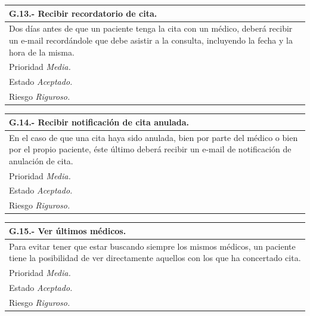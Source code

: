 \documentclass[a4paper,oneside,11pt]{book}
\begin{document}
\begin{center}
\begin{tabulary}{15cm}{|L|}
	\hline
		\bf{G.13.- Recibir recordatorio de cita.} \\
	\hline
		Dos días antes de que un paciente tenga la cita con un médico, deberá recibir un e-mail recordándole que debe asistir a la consulta, incluyendo la fecha y la hora de la misma.\\
	\hline
		Prioridad \textit{Media.} \\
	\hline
		Estado \textit{Aceptado.} \\
	\hline
		Riesgo \textit{Riguroso.} \\
	\hline
\end{tabulary}
\end{center}

\begin{center}
\begin{tabulary}{15cm}{|L|}
	\hline
		\bf{G.14.- Recibir notificación de cita anulada.} \\
	\hline
		En el caso de que una cita haya sido anulada, bien por parte del médico o bien por el propio paciente, éste último deberá recibir un e-mail de notificación de anulación de cita.\\
	\hline
		Prioridad \textit{Media.} \\
	\hline
		Estado \textit{Aceptado.} \\
	\hline
		Riesgo \textit{Riguroso.} \\
	\hline
\end{tabulary}
\end{center}

\begin{center}
\begin{tabulary}{15cm}{|L|}
	\hline
		\bf{G.15.- Ver últimos médicos.} \\
	\hline
		Para evitar tener que estar buscando siempre los mismos médicos, un paciente tiene la posibilidad de ver directamente aquellos con los que ha concertado cita. \\
	\hline
		Prioridad \textit{Media.} \\
	\hline
		Estado \textit{Aceptado.} \\
	\hline
		Riesgo \textit{Riguroso.} \\
	\hline
\end{tabulary}
\end{center}
\end{document}
